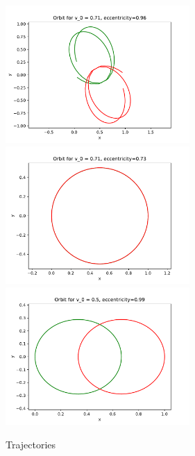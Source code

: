 \documentclass{article}
\begin{document}
\begin{figure}[ht]
    \centering
    \includegraphics[width=7cm]{1.pdf} 
    \includegraphics[width=7cm]{2.pdf} 
    \includegraphics[width=7cm]{3.pdf} 
    \caption{Trajectories}
\end{figure}
\end{document}
